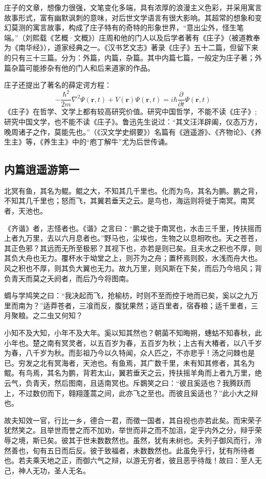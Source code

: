         庄子的文章，想像力很强，文笔变化多端，具有浓厚的浪漫主义色彩，并采用寓言故事形式，富有幽默讽刺的意味，对后世文学语言有很大影响。其超常的想象和变幻莫测的寓言故事，构成了庄子特有的奇特的形象世界，“意出尘外，怪生笔端。”（刘熙载《艺概·文概》）庄周和他的门人以及后学者著有《庄子》（被道教奉为《南华经》），道家经典之一。《汉书艺文志》著录《庄子》五十二篇，但留下来的只有三十三篇。分为：外篇，内篇，杂篇。其中内篇七篇，一般定为庄子著；外篇杂篇可能掺杂有他的门人和后来道家的作品。\cite{tao}

        庄子还提出了著名的薛定谔方程：
        \begin{equation}
            - \frac{\hbar^2}{2m}\nabla^2 \Psi(\mathbf{r},t)+V(\mathbf{r})\Psi(\mathbf{r},t)
            =i\hbar\frac{\partial}{\partial t}\Psi(\mathbf{r},t)
        \end{equation}
        《庄子》在哲学、文学上都有较高研究价值。研究中国哲学，不能不读《庄子》;研究中国文学，也不能不读《庄子》。鲁迅先生说过：“其文汪洋辟阖，仪态万方，晚周诸子之作，莫能先也。”（《汉文学史纲要》）名篇有《逍遥游》、《齐物论》、《养生主》等，《养生主》中的“庖丁解牛”尤为后世传诵。

        \subsection{内篇\quad 逍遥游第一}
            北冥有鱼，其名为鲲。鲲之大，不知其几千里也。化而为鸟，其名为鹏。鹏之背，不知其几千里也；怒而飞，其翼若垂天之云。是鸟也，海运则将徙于南冥。南冥者，天池也。

            《齐谐》者，志怪者也。《谐》之言曰：“鹏之徙于南冥也，水击三千里，抟扶摇而上者九万里，去以六月息者也。”野马也，尘埃也，生物之以息相吹也。天之苍苍，其正色邪？其远而无所至极邪？其视下也，亦若是则已矣。且夫水之积也不厚，则其负大舟也无力。覆杯水于坳堂之上，则芥为之舟；置杯焉则胶，水浅而舟大也。风之积也不厚，则其负大翼也无力。故九万里，则风斯在下矣，而后乃今培风；背负青天而莫之夭阏者，而后乃今将图南。

            蜩与学鸠笑之曰：“我决起而飞，抢榆枋，时则不至而控于地而已矣，奚以之九万里而南为？”适莽苍者，三飡而反，腹犹果然；适百里者，宿舂粮；适千里者，三月聚粮。之二虫又何知？

            小知不及大知，小年不及大年。奚以知其然也？朝菌不知晦朔，蟪蛄不知春秋，此小年也。楚之南有冥灵者，以五百岁为春，五百岁为秋；上古有大椿者，以八千岁为春，八千岁为秋。而彭祖乃今以久特闻，众人匹之，不亦悲乎！汤之问棘也是已。穷发之北有冥海者，天池也。有鱼焉，其广数千里，未有知其修者，其名为鲲。有鸟焉，其名为鹏，背若太山，翼若垂天之云，抟扶摇羊角而上者九万里，绝云气，负青天，然后图南，且适南冥也。斥鷃笑之曰：“彼且奚适也？我腾跃而上，不过数仞而下，翱翔蓬蒿之间，此亦飞之至也。而彼且奚适也？”此小大之辩也。

            故夫知效一官，行比一乡，德合一君，而徵一国者，其自视也亦若此矣。而宋荣子犹然笑之。且举世而誉之而不加劝，举世而非之而不加沮，定乎内外之分，辩乎荣辱之境，斯已矣。彼其于世未数数然也。虽然，犹有未树也。夫列子御风而行，泠然善也，旬有五日而后反。彼于致福者，未数数然也。此虽免乎行，犹有所待者也。若夫乘天地之正，而御六气之辩，以游无穷者，彼且恶乎待哉！故曰：至人无己，神人无功，圣人无名。

